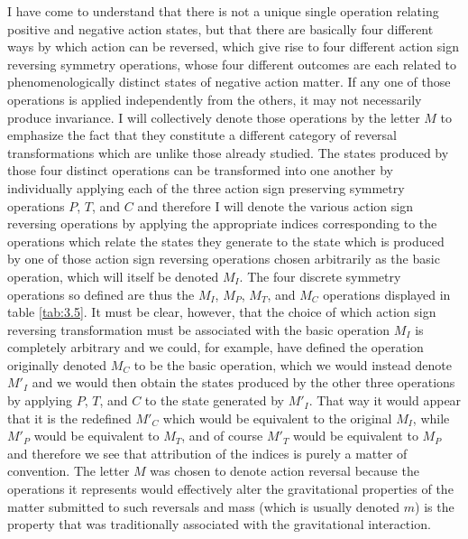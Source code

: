 \documentclass[notitlepage,12pt]{report}
\begin{document}
I have come to understand that there is not a unique single operation relating positive and negative action states, but that there are basically four different ways by which action can be reversed, which give rise to four different action sign reversing symmetry operations, whose four different outcomes are each related to phenomenologically distinct states of negative action matter. If any one of those operations is applied independently from the others, it may not necessarily produce invariance. I will collectively denote those operations by the letter $M$ to emphasize the fact that they constitute a different category of reversal transformations which are unlike those already studied. The states produced by those four distinct operations can be transformed into one another by individually applying each of the three action sign preserving symmetry operations $P$, $T$, and $C$ and therefore I will denote the various action sign reversing operations by applying the appropriate indices corresponding to the operations which relate the states they generate to the state which is produced by one of those action sign reversing operations chosen arbitrarily as the basic operation, which will itself be denoted $M_I$. The four discrete symmetry operations so defined are thus the $M_I$, $M_P$, $M_T$, and $M_C$ operations displayed in table \ref{tab:3.5}. It must be clear, however, that the choice of which action sign reversing transformation must be associated with the basic operation $M_I$ is completely arbitrary and we could, for example, have defined the operation originally denoted $M_C$ to be the basic operation, which we would instead denote $M'_I$ and we would then obtain the states produced by the other three operations by applying $P$, $T$, and $C$ to the state generated by $M'_I$. That way it would appear that it is the redefined $M'_C$ which would be equivalent to the original $M_I$, while $M'_P$ would be equivalent to $M_T$, and of course $M'_T$ would be equivalent to $M_P$ and therefore we see that attribution of the indices is purely a matter of convention. The letter $M$ was chosen to denote action reversal because the operations it represents would effectively alter the gravitational properties of the matter submitted to such reversals and mass (which is usually denoted $m$) is the property that was traditionally associated with the gravitational interaction.
\end{document}
